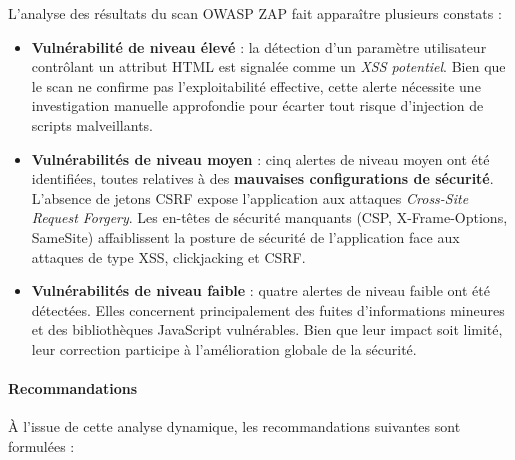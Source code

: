 \documentclass[12pt,a4paper,oneside]{report}
\begin{document}
L'analyse des résultats du scan OWASP ZAP fait apparaître plusieurs constats :

\begin{itemize}[label={\color{gold}}, leftmargin=*]
	\item \textbf{Vulnérabilité de niveau élevé} : la détection d'un paramètre 
	utilisateur contrôlant un attribut HTML est signalée comme un \textit{XSS potentiel}. 
	Bien que le scan ne confirme pas l'exploitabilité effective, cette alerte 
	nécessite une investigation manuelle approfondie pour écarter tout risque 
	d'injection de scripts malveillants.
	
	\item \textbf{Vulnérabilités de niveau moyen} : cinq alertes de niveau moyen 
	ont été identifiées, toutes relatives à des \textbf{mauvaises configurations 
		de sécurité}. L'absence de jetons CSRF expose l'application aux attaques 
	\textit{Cross-Site Request Forgery}. Les en-têtes de sécurité manquants 
	(CSP, X-Frame-Options, SameSite) affaiblissent la posture de sécurité de 
	l'application face aux attaques de type XSS, clickjacking et CSRF.
	
	\item \textbf{Vulnérabilités de niveau faible} : quatre alertes de niveau 
	faible ont été détectées. Elles concernent principalement des fuites 
	d'informations mineures et des bibliothèques JavaScript vulnérables. 
	Bien que leur impact soit limité, leur correction participe à l'amélioration 
	globale de la sécurité.
\end{itemize}

\paragraph{Recommandations}

À l'issue de cette analyse dynamique, les recommandations suivantes sont formulées :
\end{document}

